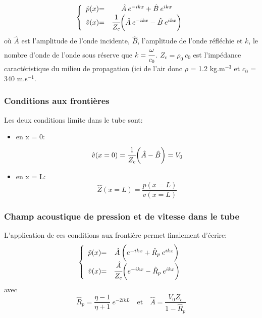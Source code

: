 \documentclass[a4paper, 11pt]{article}
\begin{document}
\[ \left \{
\begin{array}{c @{= \quad} c}
	 \hat{p}(x)			& \hat{A} \: e^{-ikx} + \hat{B} \: e^{ikx}\\
	 \hat{v}(x)			& \cfrac{1}{Z_c} \bigg( \hat{A} \: e^{-ikx} - \hat{B} \: e^{ikx} \bigg)
\end{array}
\right. \]
où $\hat{A}$ est l'amplitude de l'onde incidente, $\hat{B}$, l'amplitude de l'onde réfléchie et $k$, le nombre d'onde de l'onde sous réserve que $k = \cfrac{\omega}{c_0}$. $Z_c = \rho_0 \: c_0$ est l'impédance caractéristique du milieu de propagation (ici de l'air donc $\rho$ = 1.2 kg.m$^{-3}$ et $c_0$ = 340 m.s$^{-1}$.  

\subsubsection{Conditions aux frontières}
Les deux conditions limite dans le tube sont:
\begin{itemize}
	\item en x = 0:
\begin{equation*}
	\hat{v} (x=0) = \cfrac{1}{Z_c} \bigg( \hat{A} - \hat{B} \bigg) = V_0
\end{equation*}

	\item en x = L: 
\begin{equation*}
	\hat{Z}(x=L) = \frac{\hat{p} (x=L)}{\hat{v} (x=L)}
\end{equation*}
\end{itemize}

\subsubsection{Champ acoustique de pression et de vitesse dans le tube}
L'application de ces conditions aux frontière permet finalement d'écrire:
\[ \left \{
\begin{array}{c @{= \quad} c}
	 \hat{p}(x)			& \hat{A} \: \bigg( e^{-ikx} + \hat{R}_p \: e^{ikx} \bigg)\\
	 \hat{v}(x)			& \cfrac{\hat{A}}{Z_c} \bigg( e^{-ikx} - \hat{R}_p \: e^{ikx} \bigg)
\end{array}
\right. \]
avec 
\begin{equation*}
	\hat{R}_p = \frac{\eta - 1}{\eta + 1} \: e^{-2ikL} \quad \text{et} \quad \hat{A} = \frac{V_0 Z_c}{1 - \hat{R}_p}
\end{equation*}
\end{document}
